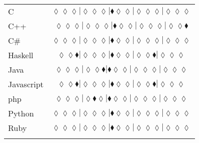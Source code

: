 \begin{table*}
{\begin{tabular}{l c}
C & $\scriptscriptstyle\lozenge\lozenge\lozenge|\lozenge\lozenge\lozenge|\blacklozenge\lozenge\lozenge|\lozenge\lozenge\lozenge|\lozenge\lozenge\lozenge$ \\
C++ & $\scriptscriptstyle\lozenge\lozenge\lozenge|\lozenge\lozenge\lozenge|\blacklozenge\lozenge\lozenge|\lozenge\lozenge\lozenge|\lozenge\lozenge\blacklozenge$ \\
C\# & $\scriptscriptstyle\lozenge\lozenge\lozenge|\lozenge\lozenge\lozenge|\blacklozenge\lozenge\lozenge|\lozenge\lozenge\lozenge|\lozenge\lozenge\lozenge$ \\
Haskell & $\scriptscriptstyle\lozenge\lozenge\blacklozenge|\lozenge\lozenge\lozenge|\blacklozenge\lozenge\lozenge|\lozenge\lozenge\blacklozenge|\lozenge\lozenge\lozenge$ \\
Java & $\scriptscriptstyle\lozenge\lozenge\lozenge|\lozenge\lozenge\blacklozenge|\blacklozenge\lozenge\lozenge|\lozenge\lozenge\lozenge|\lozenge\lozenge\lozenge$ \\
Javascript & $\scriptscriptstyle\lozenge\lozenge\blacklozenge|\lozenge\lozenge\lozenge|\blacklozenge\lozenge\lozenge|\lozenge\lozenge\blacklozenge|\lozenge\lozenge\lozenge$ \\
{\sc php} & $\scriptscriptstyle\lozenge\lozenge\lozenge|\lozenge\blacklozenge\lozenge|\blacklozenge\lozenge\lozenge|\lozenge\lozenge\lozenge|\lozenge\lozenge\lozenge$ \\
Python & $\scriptscriptstyle\lozenge\lozenge\lozenge|\lozenge\lozenge\lozenge|\blacklozenge\lozenge\lozenge|\lozenge\lozenge\lozenge|\lozenge\lozenge\lozenge$ \\
Ruby & $\scriptscriptstyle\lozenge\lozenge\lozenge|\lozenge\lozenge\lozenge|\blacklozenge\lozenge\lozenge|\lozenge\lozenge\lozenge|\lozenge\lozenge\lozenge$ \\

\hline
& \\
\end{tabular}
} 
\end{table*}
